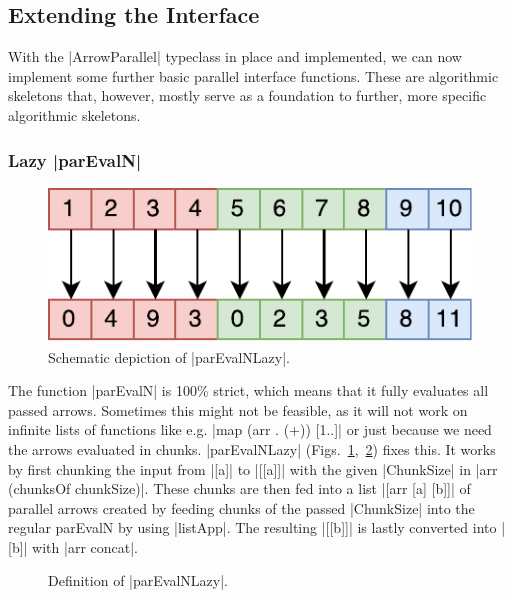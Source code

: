 \subsection{Extending the Interface}
\label{sec:extending-interface}
With the |ArrowParallel| typeclass in place and implemented, we can now implement some further basic parallel interface functions. These are algorithmic skeletons that, however, mostly serve as a foundation to further, more specific algorithmic skeletons.

\subsubsection{Lazy |parEvalN|}
\begin{figure}[t]
	\includegraphics[scale=0.7]{images/parEvalNLazy}
	\caption{Schematic depiction of |parEvalNLazy|.}
	\label{fig:parEvalNLazyImg}
\end{figure}
The function |parEvalN| is 100\% strict, which means that it fully evaluates all passed arrows. Sometimes this might not be feasible, as it will not work on infinite lists of functions like e.g. |map (arr . (+)) [1..]| or just because we need the arrows evaluated in chunks. |parEvalNLazy| (Figs.~\ref{fig:parEvalNLazyImg},~\ref{fig:parEvalNLazy}) fixes this. It works by first chunking the input from |[a]| to |[[a]]| with the given |ChunkSize| in |arr (chunksOf chunkSize)|. These chunks are then fed into a list |[arr [a] [b]]| of parallel arrows created by feeding chunks of the passed |ChunkSize| into the regular parEvalN by using |listApp|. The resulting |[[b]]| is lastly converted into |[b]| with |arr concat|.
\begin{figure}[t]
\caption{Definition of |parEvalNLazy|.}
\label{fig:parEvalNLazy}
\end{figure}

